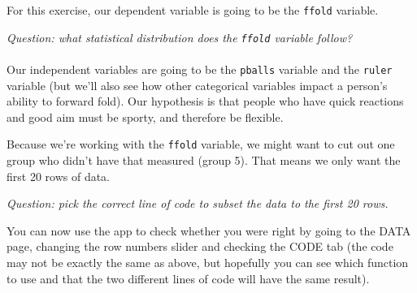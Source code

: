 \documentclass[
]{book}
\newenvironment{Shaded}{\begin{snugshade}}{\end{snugshade}}
\newcommand{\CommentTok}[1]{\textcolor[rgb]{0.56,0.35,0.01}{\textit{#1}}}
\newcommand{\DecValTok}[1]{\textcolor[rgb]{0.00,0.00,0.81}{#1}}
\newcommand{\KeywordTok}[1]{\textcolor[rgb]{0.13,0.29,0.53}{\textbf{#1}}}
\newcommand{\NormalTok}[1]{#1}
\newcommand{\OperatorTok}[1]{\textcolor[rgb]{0.81,0.36,0.00}{\textbf{#1}}}
\newcommand{\StringTok}[1]{\textcolor[rgb]{0.31,0.60,0.02}{#1}}
\begin{document}
For this exercise, our dependent variable is going to be the \texttt{ffold} variable.

\emph{Question: what statistical distribution does the \texttt{ffold} variable follow?}\\
~\\

Our independent variables are going to be the \texttt{pballs} variable and the
\texttt{ruler} variable (but we'll also see how other categorical variables impact
a person's ability to forward fold). Our hypothesis is that people who have
quick reactions and good aim must be sporty, and therefore be flexible.

Because we're working with the \texttt{ffold} variable, we might want to cut out
one group who didn't have that measured (group 5). That means we only want the first
20 rows of data.

\emph{Question: pick the correct line of code to subset the data to the first 20 rows.}

\begin{Shaded}
\end{Shaded}

You can now use the app to check whether you were right by going to the
DATA page, changing the row numbers slider and checking the CODE tab
(the code may not be exactly the same as above, but hopefully you can see which
function to use and that the two different lines of code will have the same result).\\
~\\
\end{document}
